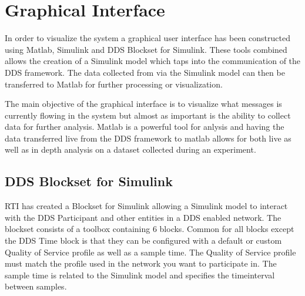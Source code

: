 
\section{Graphical Interface}
In order to visualize the system a graphical user interface has been constructed using Matlab, Simulink and DDS Blockset for Simulink.
These tools combined allows the creation of a Simulink model which taps into the communication of the DDS framework.
The data collected from via the Simulink model can then be transferred to Matlab for further processing or visualization.

The main objective of the graphical interface is to visualize what messages is currently flowing in the system but almost as important is the ability to collect data for further analysis.
Matlab is a powerful tool for anlysis and having the data transferred live from the DDS framework to matlab allows for both live as well as in depth analysis on a dataset collected during an experiment.

\subsection{DDS Blockset for Simulink}
RTI has created a Blockset for Simulink allowing a Simulink model to interact with the DDS Participant and other entities in a DDS enabled network.
The blockset consists of a toolbox containing 6 blocks. Common for all blocks except the DDS Time block is that they can be configured with a default or custom Quality of Service profile as well as a sample time. The Quality of Service profile must match the profile used in the network you want to participate in. The sample time is related to the Simulink model and specifies the timeinterval between samples.

